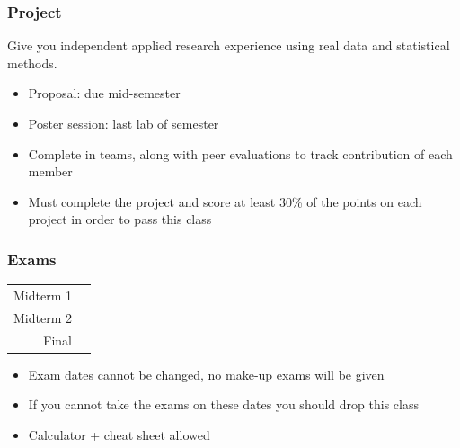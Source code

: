 \documentclass[11pt,containsverbatim,handout,xcolor=xelatex,dvipsnames,table]{beamer}
\begin{document}

\begin{frame}
\frametitle{Project}

 Give you independent applied research experience using real data and 
statistical methods.

\begin{itemize}

\item Proposal: due mid-semester

\item Poster session: last lab of semester

\item Complete in teams, along with peer evaluations to track contribution of each member

\item Must complete the project and score at least 30\% of the points on each 
project in order to pass this class

\end{itemize}

\end{frame}


\begin{frame}
\frametitle{Exams}

\begin{center}
\renewcommand\arraystretch{1.25}
{\footnotesize
\begin{tabular}{ r | l }
Midterm 1								& \ExamADate \\    
Midterm 2 							& \ExamBDate \\    
Final 								 & \FinalDate   
\end{tabular}
}
\end{center}

\begin{itemize}

\item Exam dates cannot be changed, no make-up exams will be given

\item If you cannot take the exams on these dates you should drop this class

\item Calculator + cheat sheet allowed

\end{itemize}

\end{frame}
\end{document}
